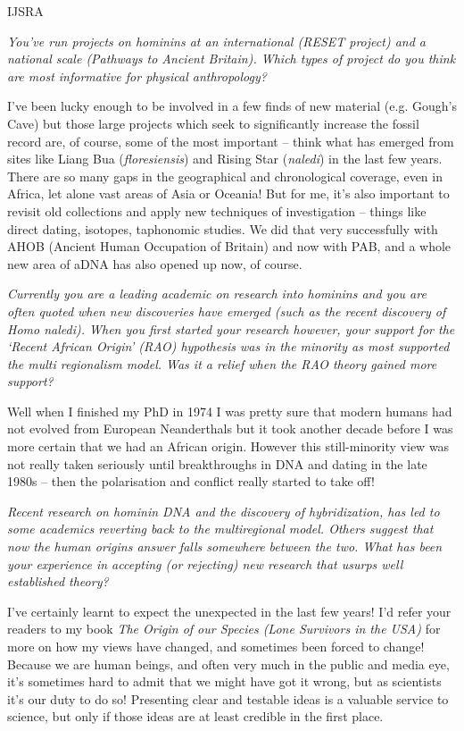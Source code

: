 \documentclass{ijsra}
\begin{document}
\begin{labeling}{IJSRA}
\item[IJSRA]
\emph{You’ve run projects on hominins at an international (RESET project) and a national scale (Pathways to Ancient Britain).
Which types of project do you think are most informative for physical anthropology?}

\item[CS]
I’ve been lucky enough to be involved in a few finds of new material (e.g. Gough’s Cave) but
those large projects which seek to significantly increase the fossil record are, of course,
some of the most important – think what has emerged from sites like Liang Bua (\emph{floresiensis}) and Rising Star (\emph{naledi})
in the last few years. 
There are so many gaps in the geographical and chronological coverage, even in Africa, let alone vast areas of Asia or Oceania!
But for me, it’s also important to revisit old collections and apply new techniques of investigation – things like direct dating,
isotopes, taphonomic studies. 
We did that very successfully with AHOB (Ancient Human Occupation of Britain) and now with PAB,
and a whole new area of aDNA has also opened up now, of course.

\item[IJSRA]
\emph{Currently you are a leading academic on research into hominins and you are often quoted when new discoveries
have emerged (such as the recent discovery of \emph{Homo naledi}). When you first started your research however,
your support for the ‘Recent African Origin’ (RAO) hypothesis was in the minority as most supported the multi regionalism model.
Was it a relief when the RAO theory gained more support?}

\item[CS]
Well when I finished my PhD in 1974 I was pretty sure that modern humans had not evolved from European Neanderthals but
it took another decade before I was more certain that we had an African origin.
However this still-minority view was not really taken seriously until breakthroughs in DNA and dating in the late
1980s – then the polarisation and conflict really started to take off!

\item[IJSRA]
\emph{Recent research on hominin DNA and the discovery of hybridization, has led to some academics reverting back to
the multiregional model. 
Others suggest that now the human origins answer falls somewhere between the two.
What has been your experience in accepting (or rejecting) new research that usurps well established theory?}

\item[CS]
I’ve certainly learnt to expect the unexpected in the last few years!
I’d refer your readers to my book \emph{The Origin of our Species (Lone Survivors in the USA)} for more on how my views have changed,
and sometimes been forced to change!
Because we are human beings, and often very much in the public and media eye, it’s sometimes hard to
admit that we might have got it wrong, but as scientists it’s our duty to do so!
Presenting clear and testable ideas is a valuable service to science, but only if those ideas are at least credible in the first place.


\end{labeling}
\end{document}
